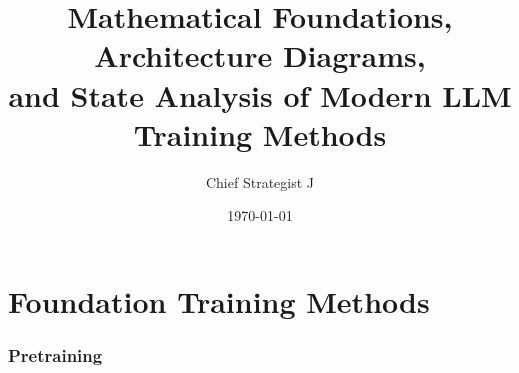 \documentclass{article}
\begin{document}
\title{\textbf{Mathematical Foundations, Architecture Diagrams,\\and State Analysis of Modern LLM Training Methods}}
\author{Chief Strategist J}
\date{\today}
\maketitle
\tableofcontents
\newpage

\part{Foundation Training Methods}

\section{Pretraining}
\end{document}
